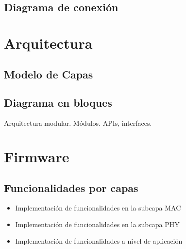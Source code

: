 \subsection{Diagrama de conexión}
\label{sec:conexión}


\section{Arquitectura}
\label{sec:arq}

\subsection{Modelo de Capas}

\subsection{Diagrama en bloques}

Arquitectura modular. Módulos. APIs, interfaces.



\section{Firmware}
\label{sec:firm}

\subsection{Funcionalidades por capas}

\begin{itemize}
	\item Implementación de funcionalidades en la subcapa MAC

	\item Implementación de funcionalidades en la subcapa PHY

	\item Implementación de funcionalidades a nivel de aplicación
	
\end{itemize}


